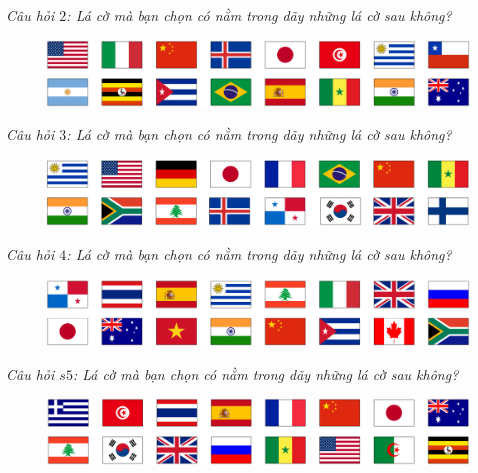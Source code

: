 \begin{multicols}{2}
	\textit{Câu hỏi $2$: Lá cờ mà bạn chọn có nằm trong dãy những lá cờ sau không?}
	\begin{figure}[H]
		\vspace*{-5pt}
		\centering
		\captionsetup{labelformat= empty, justification=centering}
		\includegraphics[width= 1\linewidth]{3}
		\vspace*{-15pt}
	\end{figure}
	\textit{Câu hỏi $3$: Lá cờ mà bạn chọn có nằm trong dãy những lá cờ sau không?}
	\begin{figure}[H]
		\vspace*{-5pt}
		\centering
		\captionsetup{labelformat= empty, justification=centering}
		\includegraphics[width= 1\linewidth]{4}
		\vspace*{-15pt}
	\end{figure}
	\textit{Câu hỏi $4$: Lá cờ mà bạn chọn có nằm trong dãy những lá cờ sau không?}
	\begin{figure}[H]
		\vspace*{-5pt}
		\centering
		\captionsetup{labelformat= empty, justification=centering}
		\includegraphics[width= 1\linewidth]{5}
		\vspace*{-15pt}
	\end{figure}
	\textit{Câu hỏi $s5$: Lá cờ mà bạn chọn có nằm trong dãy những lá cờ sau không?}
	\begin{figure}[H]
		\vspace*{5pt}
		\centering
		\captionsetup{labelformat= empty, justification=centering}
		\includegraphics[width= 1\linewidth]{6}

\end{figure}
\end{multicols}

